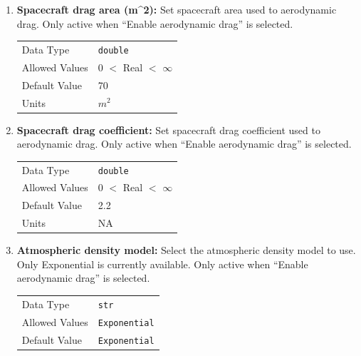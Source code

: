 \begin{enumerate}
    \item \textbf{Spacecraft drag area (m\^{}2):} Set spacecraft area used to aerodynamic drag. Only active when ``Enable aerodynamic drag'' is selected.

        \begin{table}[H]
            \hspace{2cm}
            \begin{tabular}{ll}
            Data Type & \verb|double| \\
            Allowed Values & 0 $<$ Real $<$ $\infty$ \\
            Default Value & 70 \\
            Units & $m^2$
            \end{tabular}
        \end{table}

    \item \textbf{Spacecraft drag coefficient:} Set spacecraft drag coefficient used to aerodynamic drag. Only active when ``Enable aerodynamic drag'' is selected.

        \begin{table}[H]
            \hspace{2cm}
            \begin{tabular}{ll}
            Data Type & \verb|double| \\
            Allowed Values & 0 $<$ Real $<$ $\infty$ \\
            Default Value & 2.2 \\
            Units & NA
            \end{tabular}
        \end{table}

    \item \textbf{Atmospheric density model:} Select the atmospheric density model to use. Only Exponential is currently available. Only active when ``Enable aerodynamic drag'' is selected.

        \begin{table}[H]
            \hspace{2cm}
            \begin{tabular}{lp{3cm}}
            Data Type & \verb|str| \\
            Allowed Values & \verb|Exponential|\\
            Default Value & \verb|Exponential|\\
            \end{tabular}
        \end{table}


\end{enumerate}
